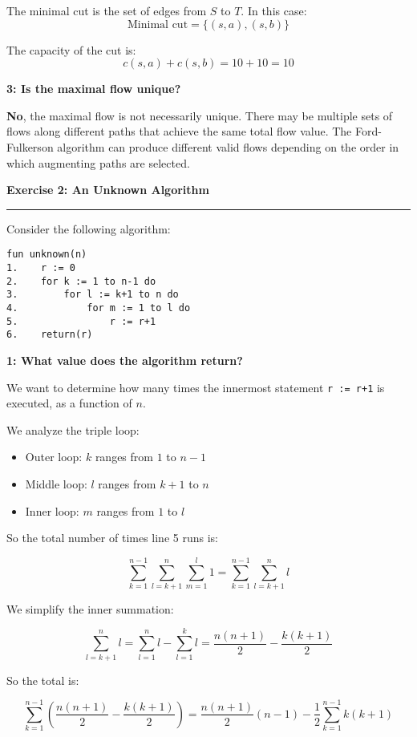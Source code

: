 \documentclass{article}
\theoremstyle{theorem}
\theoremstyle{definition}
\theoremstyle{remark}
\begin{document}
The minimal cut is the set of edges from $S$ to $T$. In this case:
\[
\text{Minimal cut} = \{(s, a), (s, b)\}
\]

The capacity of the cut is:
\[
c(s,a) + c(s,b) = 10 + 10 = \boxed{10}
\]

\vspace{0.5em}

\textbf{3: Is the maximal flow unique?}

\textbf{No}, the maximal flow is not necessarily unique. There may be multiple sets of flows along different paths that achieve the same total flow value. The Ford-Fulkerson algorithm can produce different valid flows depending on the order in which augmenting paths are selected.

\textbf{Exercise 2: An Unknown Algorithm}
\vspace{0.5em}
\hrule
\vspace{0.5em}
Consider the following algorithm:

\begin{verbatim}
fun unknown(n)
1.    r := 0
2.    for k := 1 to n-1 do
3.        for l := k+1 to n do
4.            for m := 1 to l do
5.                r := r+1
6.    return(r)
\end{verbatim}

\textbf{1: What value does the algorithm return?}

We want to determine how many times the innermost statement \texttt{r := r+1} is executed, as a function of $n$.

We analyze the triple loop:

\begin{itemize}
    \item Outer loop: $k$ ranges from $1$ to $n-1$
    \item Middle loop: $l$ ranges from $k+1$ to $n$
    \item Inner loop: $m$ ranges from $1$ to $l$
\end{itemize}

So the total number of times line 5 runs is:

\[
\sum_{k=1}^{n-1} \sum_{l=k+1}^{n} \sum_{m=1}^{l} 1 = \sum_{k=1}^{n-1} \sum_{l=k+1}^{n} l
\]

We simplify the inner summation:

\[
\sum_{l=k+1}^{n} l = \sum_{l=1}^{n} l - \sum_{l=1}^{k} l = \frac{n(n+1)}{2} - \frac{k(k+1)}{2}
\]

So the total is:

\[
\sum_{k=1}^{n-1} \left( \frac{n(n+1)}{2} - \frac{k(k+1)}{2} \right)
= \frac{n(n+1)}{2}(n-1) - \frac{1}{2} \sum_{k=1}^{n-1} k(k+1)
\]
\end{document}
